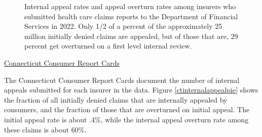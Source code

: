 \documentclass[12pt, a4paper,twoside]{report}
\theoremstyle{plain} %
\theoremstyle{definition} %
\theoremstyle{remark} %
\numberwithin{equation}{chapter}
\begin{document}
\begin{figure}[h!]
\begin{subfigure}[b]{0.49\textwidth}
			\end{subfigure}
			\caption{Internal appeal rates and appeal overturn rates among insurers who submitted health care claims reports to the Department of Financial Services in 2022. Only 1/2 of a percent of the approximately 25 million initially denied claims are appealed, but of those that are, 29 percent get overturned on a first level internal review.}
			\label{nyinternalappealpie}
		\end{figure}
	
		\underline{Connecticut Consumer Report Cards}
		
		The Connecticut Consumer Report Cards document the number of internal appeals submitted for each insurer in the data. Figure \ref{ctinternalappealpie} shows the fraction of all initially denied claims that are internally appealed by consumers, and the fraction of those that are overturned on initial appeal. The initial appeal rate is about .4\%, while the internal appeal overturn rate among these claims is about 60\%.
		
\end{document}
